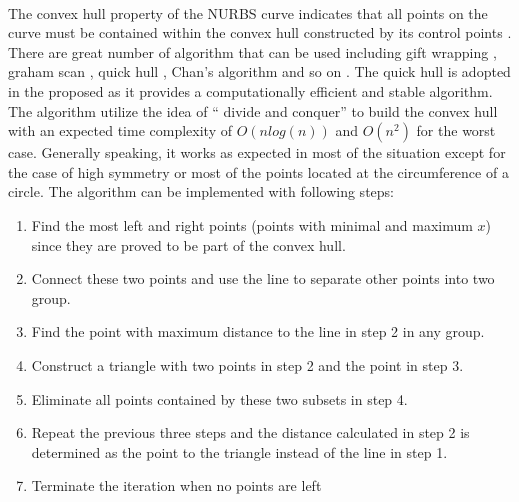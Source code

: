 \paragraph{}
The convex hull property of the NURBS curve indicates that all points on the curve must be contained within the convex hull constructed by its control points \citep{SELIMOVIC2009772}.
There are great number of algorithm that can be used including gift wrapping \citep{Cormen:2009:IAT:1614191}, graham scan \citep{ANDERSON197853}, quick hull \citep{Barber:1996:QAC:235815.235821}, Chan's algorithm \citep{Chan1996} and so on \citep{doi:10.1137/0215021, ANDREW1979216}.
The quick hull is adopted in the proposed as it provides a computationally efficient and stable algorithm.
The algorithm utilize the idea of `` divide and conquer'' to build the convex hull with an expected time complexity of $O(nlog(n))$ and  $O(n^2)$ for the worst case.
Generally speaking, it works as expected in most of the situation except for the case of high symmetry or most of the points located at the circumference of a circle.
The algorithm can be implemented with following steps:
\begin{enumerate}
    \item Find the most left and right points (points with minimal and maximum $x$) since they are proved to be part of the convex hull.
    \item Connect these two points and use the line to separate other points into two group.
    \item Find the point with maximum distance to the line in step 2 in any group.
    \item Construct a triangle with two points in step 2 and the point in step 3.
    \item Eliminate all points contained by these two subsets in step 4.
    \item Repeat the previous three steps and the distance calculated in step 2 is determined as the point to the triangle instead of the line in step 1.
    \item Terminate the iteration when no points are left
\end{enumerate}